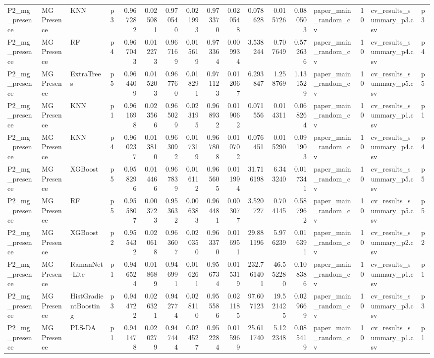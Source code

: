 \begin{tabular}{llllrrrrrrrrrlrll}
P2_mg_presence & MG Presence & KNN & p3 & 0.967282 & 0.025081 & 0.970540 & 0.021993 & 0.973370 & 0.020548 & 0.078628 & 0.015726 & 0.080503 & paper_main_random_cv & 10 & cv_results_summary_p3.csv & p3 \\
P2_mg_presence & MG Presence & RF & p4 & 0.967043 & 0.012273 & 0.967169 & 0.015619 & 0.973364 & 0.009934 & 3.538244 & 0.707649 & 0.572636 & paper_main_random_cv & 10 & cv_results_summary_p4.csv & p4 \\
P2_mg_presence & MG Presence & ExtraTrees & p5 & 0.964409 & 0.015203 & 0.967760 & 0.018291 & 0.971123 & 0.012067 & 6.293847 & 1.258769 & 1.131529 & paper_main_random_cv & 10 & cv_results_summary_p5.csv & p5 \\
P2_mg_presence & MG Presence & KNN & p1 & 0.961698 & 0.023566 & 0.965029 & 0.023195 & 0.968932 & 0.019062 & 0.071556 & 0.014311 & 0.068264 & paper_main_random_cv & 10 & cv_results_summary_p1.csv & p1 \\
P2_mg_presence & MG Presence & KNN & p4 & 0.960237 & 0.013810 & 0.963092 & 0.017319 & 0.967808 & 0.010702 & 0.076451 & 0.015290 & 0.091903 & paper_main_random_cv & 10 & cv_results_summary_p4.csv & p4 \\
P2_mg_presence & MG Presence & XGBoost & p5 & 0.958296 & 0.014466 & 0.967839 & 0.016112 & 0.965605 & 0.011994 & 31.716198 & 6.343240 & 0.017341 & paper_main_random_cv & 10 & cv_results_summary_p5.csv & p5 \\
P2_mg_presence & MG Presence & RF & p5 & 0.955807 & 0.003723 & 0.953632 & 0.006383 & 0.964481 & 0.003077 & 3.520727 & 0.704145 & 0.587962 & paper_main_random_cv & 10 & cv_results_summary_p5.csv & p5 \\
P2_mg_presence & MG Presence & XGBoost & p2 & 0.955432 & 0.020618 & 0.963607 & 0.020350 & 0.963370 & 0.016951 & 29.881196 & 5.976239 & 0.016391 & paper_main_random_cv & 10 & cv_results_summary_p2.csv & p2 \\
P2_mg_presence & MG Presence & RamanNet-Lite & p1 & 0.946524 & 0.018689 & 0.946991 & 0.016261 & 0.956734 & 0.015319 & 232.761401 & 46.552280 & 0.108386 & paper_main_random_cv & 10 & cv_results_summary_p1.csv & p1 \\
P2_mg_presence & MG Presence & HistGradientBoosting & p3 & 0.944722 & 0.026321 & 0.942774 & 0.028110 & 0.955586 & 0.021185 & 97.607123 & 19.521425 & 0.029669 & paper_main_random_cv & 10 & cv_results_summary_p3.csv & p3 \\
P2_mg_presence & MG Presence & PLS-DA & p1 & 0.941478 & 0.020279 & 0.947444 & 0.024527 & 0.952284 & 0.015969 & 25.611740 & 5.122348 & 0.085419 & paper_main_random_cv & 10 & cv_results_summary_p1.csv & p1 \\

\end{tabular}
